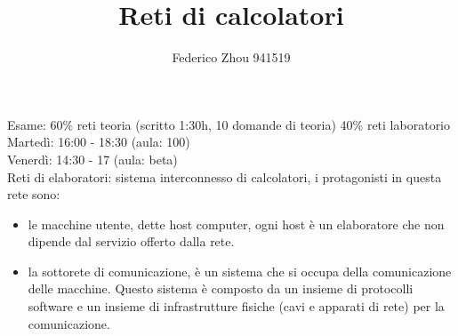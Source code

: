 \documentclass[11pt, oneside]{article}   	%
\title{Reti di calcolatori}
\author{Federico Zhou 941519}
\date{}							%
\begin{document}
\maketitle
Esame: 60\% reti teoria (scritto 1:30h, 10 domande di teoria) 40\% reti laboratorio\\
Martedì: 16:00 - 18:30 (aula: 100)\\
Venerdì: 14:30 - 17 (aula: beta)\\

Reti di elaboratori: sistema interconnesso di calcolatori, i protagonisti in questa rete sono:\begin{itemize}
\item le macchine utente, dette host computer, ogni host è un elaboratore che non dipende dal servizio offerto dalla rete.
\item la sottorete di comunicazione, è un sistema che si occupa della comunicazione delle macchine. Questo sistema è composto da un insieme di protocolli software e un insieme di infrastrutture fisiche (cavi e apparati di rete) per la comunicazione.
\end{itemize}
\end{document}
